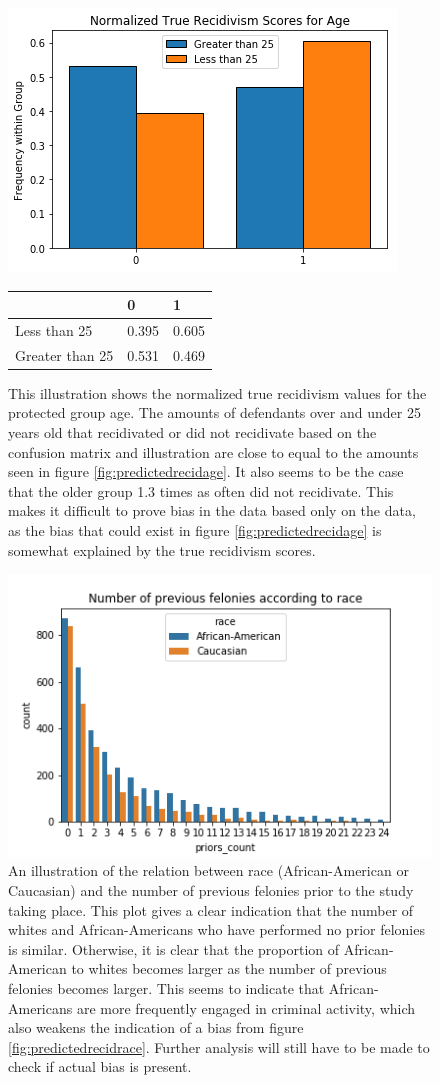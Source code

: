 \documentclass[11pt, fleqn, titlepage]{article}
\begin{document}
	\begin{figure}[H]
		\centering
		\includegraphics[width=0.5\linewidth]{imgs/true_normalized_age}
		\begin{table}[H]
			\centering
			\begin{tabular}{|l|l|l|}
				\hline
				& 0   & 1  \\ \hline
				Less than 25        & 0.395 & 0.605  \\ \hline
				Greater than 25     & 0.531 & 0.469  \\ \hline
			\end{tabular}
		\end{table}
		\caption{This illustration shows the normalized true recidivism values for the protected group age. The amounts of defendants over and under 25 years old that recidivated or did not recidivate based on the confusion matrix and illustration are close to equal to the amounts seen in figure \ref{fig:predictedrecidage}. It also seems to be the case that the older group 1.3 times as often did not recidivate. This makes it difficult to prove bias in the data based only on the data, as the bias that could exist in figure \ref{fig:predictedrecidage} is somewhat explained by the true recidivism scores.}
		\label{fig:truerecidage}
	\end{figure}
	
	
	\begin{figure}[H]
		\centering
		\includegraphics[width=0.5\linewidth]{imgs/proirs}
		\caption{An illustration of the relation between race (African-American or Caucasian) and the number of previous felonies prior to the study taking place. This plot gives a clear indication that the number of whites and African-Americans who have performed no prior felonies is similar. Otherwise, it is clear that the proportion of African-American to whites becomes larger as the number of previous felonies becomes larger. This seems to indicate that African-Americans are more frequently engaged in criminal activity, which also weakens the indication of a bias from figure \ref{fig:predictedrecidrace}. Further analysis will still have to be made to check if actual bias is present.}
		\label{fig:proirs}
	\end{figure}
	
\end{document}
